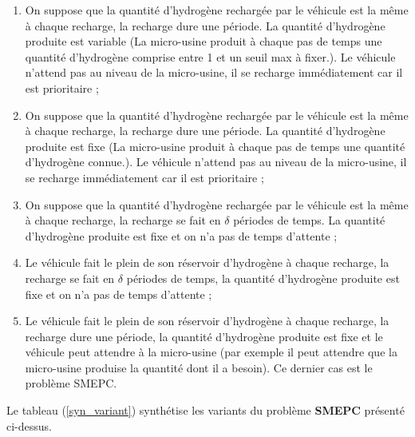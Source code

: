 	\begin{enumerate}%
		\item On suppose que la quantité d'hydrogène rechargée par le véhicule est la même à chaque recharge, la recharge dure une période. La quantité d'hydrogène produite est variable (La micro-usine produit à chaque pas de temps une quantité d'hydrogène comprise entre 1 et un seuil max à fixer.). Le véhicule n'attend pas au niveau de la micro-usine, il se recharge immédiatement car il est prioritaire ;
		\item On suppose que la quantité d'hydrogène rechargée par le véhicule est la même à chaque recharge, la recharge dure une période. La quantité d'hydrogène produite est fixe (La micro-usine produit à chaque pas de temps une quantité d'hydrogène connue.). Le véhicule n'attend pas au niveau de la micro-usine, il se recharge immédiatement car il est prioritaire ;
		\item On suppose que la quantité d'hydrogène rechargée par le véhicule est la même à chaque recharge, la recharge se fait en $\delta$ périodes de temps. La quantité d'hydrogène produite est fixe et on n'a pas de temps d'attente  ;
		\item Le véhicule fait le plein de son réservoir d'hydrogène à chaque recharge, la recharge se fait en $\delta$ périodes de temps, la quantité d'hydrogène produite est fixe et on n'a pas de temps d'attente ;
		\item Le véhicule fait le plein de son réservoir d'hydrogène à chaque recharge, la recharge dure une période, la quantité d'hydrogène produite est fixe et le véhicule peut attendre à la micro-usine (par exemple il peut attendre que la micro-usine produise la quantité dont il a besoin). Ce dernier cas est le problème SMEPC.
	\end{enumerate}
	
	Le tableau (\ref{syn_variant}) synthétise les variants du problème \textbf{SMEPC} présenté ci-dessus.
	

